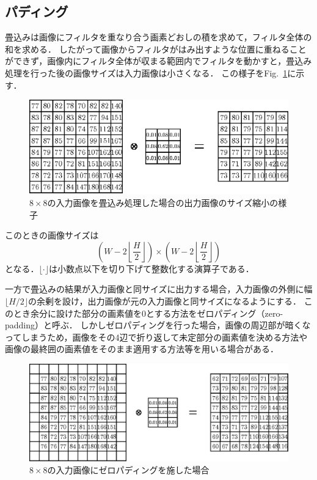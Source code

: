 \documentclass[a4paper,10pt]{jsarticle}
\begin{document}
\subsection{パディング}
畳込みは画像にフィルタを重なり合う画素どおしの積を求めて，フィルタ全体の和を求める．
したがって画像からフィルタがはみ出すような位置に重ねることができず，画像内にフィルタ全体が収まる範囲内でフィルタを動かすと，畳込み処理を行った後の画像サイズは入力画像は小さくなる．
この様子をFig.~\ref{fig:88の入力画像を畳込み処理した場合の出力画像のサイズ縮小の様子}に示す．
\begin{figure}[ht]
  \begin{center}
    \includegraphics[clip,scale=0.8]{fig/eps/convolution.eps}
  \end{center}
  \caption{$8\times 8$の入力画像を畳込み処理した場合の出力画像のサイズ縮小の様子}
  \label{fig:88の入力画像を畳込み処理した場合の出力画像のサイズ縮小の様子}
\end{figure}

このときの画像サイズは
\begin{equation}
  \left(W-2\left\lfloor \frac{H}{2}\right\rfloor\right)\times \left(W-2\left\lfloor \frac{H}{2}\right\rfloor\right)
\end{equation}
となる．$\lfloor \cdot \rfloor$は小数点以下を切り下げて整数化する演算子である．

一方で畳込みの結果が入力画像と同サイズに出力する場合，入力画像の外側に幅$\lfloor H/2\rfloor$の余剰を設け，出力画像が元の入力画像と同サイズになるようにする．
このとき余分に設けた部分の画素値を0とする方法をゼロパディング（zero-padding）と呼ぶ．
しかしゼロパディングを行った場合，画像の周辺部が暗くなってしまうため，画像をその4辺で折り返して未定部分の画素値を決める方法や画像の最終囲の画素値をそのまま適用する方法等を用いる場合がある．
\begin{figure}[t]
  \begin{center}
    \includegraphics[clip,scale=0.8]{fig/eps/zero_padding.eps}
  \end{center}
  \caption{$8\times 8$の入力画像にゼロパディングを施した場合}
  \label{fig:88の入力画像にゼロパディングを施した場合}
\end{figure}
\end{document}
